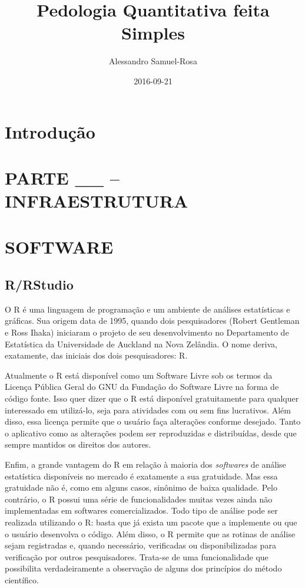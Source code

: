 \documentclass[]{book}
\title{Pedologia Quantitativa feita Simples}
\author{Alessandro Samuel-Rosa}
\date{2016-09-21}
\begin{document}
\maketitle

{
\setcounter{tocdepth}{1}
\tableofcontents
}
\chapter{Introdução}\label{intro}

\chapter*{PARTE \_\_ -- INFRAESTRUTURA}\label{parte-__-infraestrutura}

\chapter{SOFTWARE}\label{software}

\section{R/RStudio}\label{rrstudio}

O R é uma linguagem de programação e um ambiente de análises
estatísticas e gráficas. Sua origem data de 1995, quando dois
pesquisadores (Robert Gentleman e Ross Ihaka) iniciaram o projeto de seu
desenvolvimento no Departamento de Estatística da Universidade de
Auckland na Nova Zelândia. O nome deriva, exatamente, das iniciais dos
dois pesquisadores: R.

Atualmente o R está disponível como um Software Livre sob os termos da
Licença Pública Geral do GNU da Fundação do Software Livre na forma de
código fonte. Isso quer dizer que o R está disponível gratuitamente para
qualquer interessado em utilizá-lo, seja para atividades com ou sem fins
lucrativos. Além disso, essa licença permite que o usuário faça
alterações conforme desejado. Tanto o aplicativo como as alterações
podem ser reproduzidas e distribuídas, desde que sempre mantidos os
direitos dos autores.

Enfim, a grande vantagem do R em relação à maioria dos \emph{softwares}
de análise estatística disponíveis no mercado é exatamente a sua
gratuidade. Mas essa gratuidade não é, como em alguns casos, sinônimo de
baixa qualidade. Pelo contrário, o R possui uma série de funcionalidades
muitas vezes ainda não implementadas em softwares comercializados. Todo
tipo de análise pode ser realizada utilizando o R: basta que já exista
um pacote que a implemente ou que o usuário desenvolva o código. Além
disso, o R permite que as rotinas de análise sejam registradas e, quando
necessário, verificadas ou disponibilizadas para verificação por outros
pesquisadores. Trata-se de uma funcionalidade que possibilita
verdadeiramente a observação de alguns dos princípios do método
científico.
\end{document}
